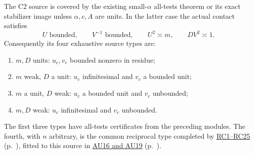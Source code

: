 \begin{proposition}
\label{pfb270019c56f:prop:c2-positive-d-partition}
The C2 source is covered by the existing small-$\alpha$ all-tests
theorem or its exact stabilizer image unless $\alpha,c,A$ are units.
In the latter case the actual contact satisfies
\[
 U\text{ bounded},\qquad V^{-1}\text{ bounded},\qquad
 U^2\asymp m,\qquad DV^2\asymp1.                 \tag{SP1}
\]
Consequently its four exhaustive source types are:
\begin{enumerate}
\item $m,D$ units: $u_c,v_c$ bounded nonzero in residue;
\item $m$ weak, $D$ a unit: $u_c$ infinitesimal and $v_c$ a bounded unit;
\item $m$ a unit, $D$ weak: $u_c$ a bounded unit and $v_c$ unbounded;
\item $m,D$ weak: $u_c$ infinitesimal and $v_c$ unbounded.
\end{enumerate}
The first three types have all-tests certificates from the preceding
modules. The fourth, with $n$ arbitrary, is the common reciprocal
type completed by \hyperref[component:p10686597065a]{RC1--RC25} (p.~\pageref{component:p10686597065a}), fitted to this source in \hyperref[component:pc0b2849f8d09]{AU16 and AU19} (p.~\pageref{component:pc0b2849f8d09}).
\end{proposition}

